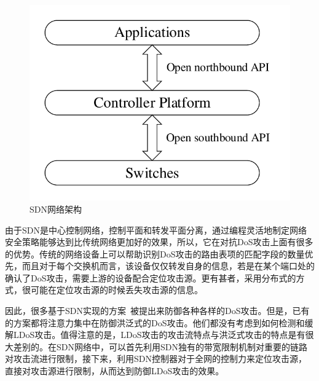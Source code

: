 \begin{figure}
    \centering
    \includegraphics[scale=0.5]{figures/SDN-network}
    \caption{SDN网络架构}
    \label{fig:sdnfig}
\end{figure}

由于SDN是中心控制网络，控制平面和转发平面分离，通过编程灵活地制定网络安全策略能够达到比传统网络更加好的效果，所以，它在对抗DoS攻击上面有很多的优势。传统的网络设备上可以帮助识别DoS攻击的路由表项的匹配字段的数量优先，而且对于每个交换机而言，该设备仅仅转发自身的信息，若是在某个端口处的确认了DoS攻击，需要上游的设备配合定位攻击源。更有甚者，采用分布式的方式，很可能在定位攻击源的时候丢失攻击源的信息。

因此，很多基于SDN实现的方案~\cite{b9, b16, b11, b23, b24}被提出来防御各种各样的DoS攻击。但是，已有的方案都将注意力集中在防御洪泛式的DoS攻击。他们都没有考虑到如何检测和缓解LDoS攻击。值得注意的是，LDoS攻击的攻击流特点与洪泛式攻击的特点是有很大差别的。在SDN网络中，可以首先利用SDN独有的带宽限制机制对重要的链路对攻击流进行限制，接下来，利用SDN控制器对于全网的控制力来定位攻击源，直接对攻击源进行限制，从而达到防御LDoS攻击的效果。


